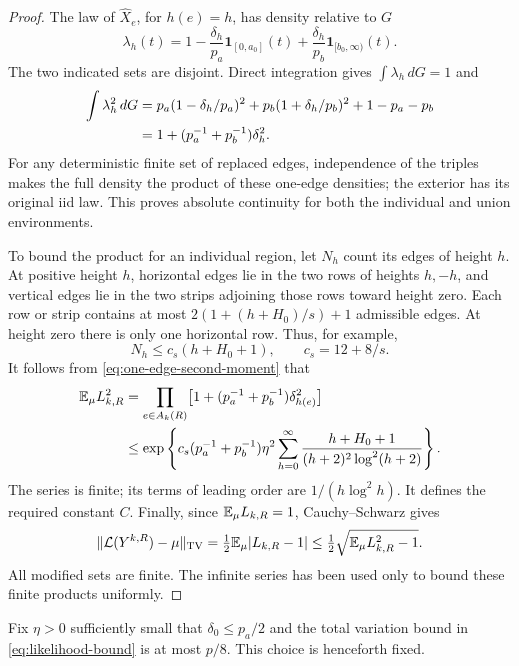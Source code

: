 \begin{proof}
The law of $\widehat X_e$, for $h(e)=h$, has density relative to $G$
\begin{equation}\label{eq:one-edge-density}
 \lambda_h(t)=1-\frac{\delta_h}{p_a}\mathbf1_{[0,a_0]}(t)
                 +\frac{\delta_h}{p_b}\mathbf1_{[b_0,\infty)}(t).
\end{equation}
The two indicated sets are disjoint.  Direct integration gives
$\int\lambda_h\,dG=1$ and
\begin{align}
 \int\lambda_h^2\,dG
 &=p_a(1-\delta_h/p_a)^2
    +p_b(1+\delta_h/p_b)^2+1-p_a-p_b\notag\\
 &=1+(p_a^{-1}+p_b^{-1})\delta_h^2.
 \label{eq:one-edge-second-moment}
\end{align}
For any deterministic finite set of replaced edges, independence of the
triples makes the full density the product of these one-edge densities;
the exterior has its original iid law.  This proves absolute continuity
for both the individual and union environments.

To bound the product for an individual region, let $N_h$ count its edges
of height $h$.  At positive height $h$, horizontal edges lie in the two
rows of heights $h,-h$, and vertical edges lie in the two strips adjoining
those rows toward height zero.  Each row or strip contains at most
$2(1+(h+H_0)/s)+1$ admissible edges.  At height zero there is only one
horizontal row.  Thus, for example,
\[
 N_h\leq c_s(h+H_0+1),\qquad c_s=12+8/s.
\]
It follows from \eqref{eq:one-edge-second-moment} that
\begin{align*}
 \mathbb E_\mu L_{k,R}^2
 &=\prod_{e\in A_k(R)}
       \bigl[1+(p_a^{-1}+p_b^{-1})\delta_{h(e)}^2\bigr]\\
 &\leq\exp\left\{
 c_s(p_a^{-1}+p_b^{-1})\eta^2
 \sum_{h=0}^{\infty}
 \frac{h+H_0+1}{(h+2)^2\log^2(h+2)}\right\}.
\end{align*}
The series is finite; its terms of leading order are
$1/(h\log^2h)$.  It defines the required constant $C$.
Finally, since $\mathbb E_\mu L_{k,R}=1$, Cauchy--Schwarz gives
\[
 \|\mathcal L(Y^{k,R})-\mu\|_{\mathrm{TV}}
 =\tfrac12\mathbb E_\mu|L_{k,R}-1|
 \leq\tfrac12\sqrt{\mathbb E_\mu L_{k,R}^2-1}.
\]
All modified sets are finite.  The infinite series has been used only
to bound these finite products uniformly.
\end{proof}

Fix $\eta>0$ sufficiently small that $\delta_0\leq p_a/2$ and the total
variation bound in \eqref{eq:likelihood-bound} is at most $p/8$.
This choice is henceforth fixed.

